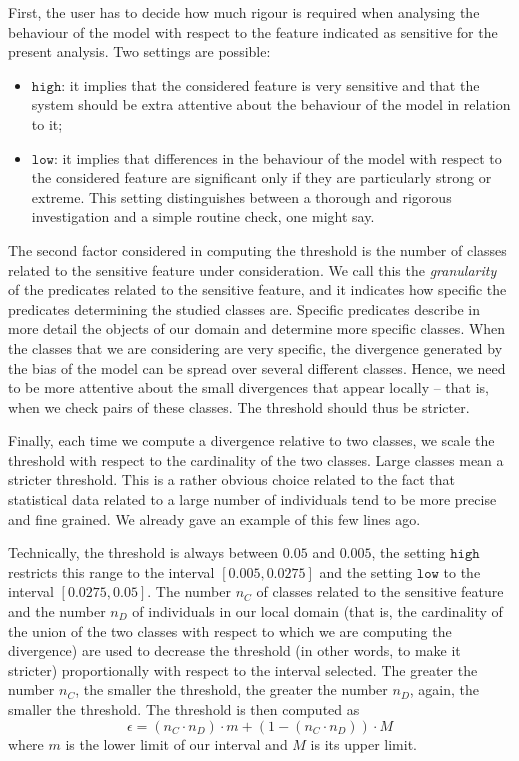 \documentclass[
]{ceurart}
\begin{document}
First, the user has to decide how much rigour is required when analysing the behaviour of the model with respect to the feature indicated as sensitive for the present analysis. Two settings are possible: 

\begin{itemize}
\item $\mathtt{high}$: it implies that the considered feature is very sensitive and that the system should be extra attentive about the behaviour of the model in relation to it;
\item $\mathtt{low}$: it implies that differences in the behaviour of the model with respect to the considered feature are significant only if they are particularly strong or extreme. This setting distinguishes between a thorough and rigorous investigation and a simple routine check, one might say.
\end{itemize}



The second factor considered in computing the threshold is the number of classes related to the sensitive feature under consideration. We  call this the {\it granularity} of the predicates related to the sensitive feature, and it indicates how specific the predicates determining the studied classes are. Specific predicates describe in more detail the objects of our domain and determine more specific classes. When the classes that we are considering are very specific, the divergence generated by the bias of the model can be spread over several different classes. Hence, we need to be more attentive about the small divergences that appear locally -- that is, when we check pairs of these classes. The threshold should thus be stricter.


Finally, each time we compute a divergence relative to two classes, we scale the threshold with respect to the cardinality of the two classes. Large classes mean a stricter threshold. This is a rather obvious choice related to the fact that statistical data related to a large number of individuals tend to be more precise and fine grained. We already gave an example of this few lines ago.

Technically, the threshold is always between $0.05$ and $0.005$, the setting $\mathtt{high}$ restricts this range to the interval $[0.005,0.0275]$ and the setting $\mathtt{low}$ to the interval $[0.0275,0.05]$. The number $n_C$ of classes related to the sensitive feature and the number $n_D$ of individuals in our local domain (that is, the cardinality of the union of the two classes with respect to which we are computing the divergence) are used to decrease the threshold (in other words, to make it stricter) proportionally with respect to the interval selected. The greater the number $n_C$, the smaller the threshold, the greater the number $n_D$, again, the smaller the threshold. The threshold is then computed as
\[
\epsilon = (n_C \cdot n_D) \cdot m + (1-(n_C \cdot n_D)) \cdot M
\]
where $m$ is the lower limit of our interval and $M$ is its upper limit.
\end{document}
